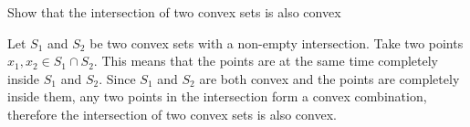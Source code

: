 \begin{problem}
Show that the intersection of two convex sets is also convex
\end{problem}

\begin{solution}
Let $S_1$ and $S_2$ be two convex sets with a non-empty intersection. Take two points $x_1, x_2 \in S_1\cap S_2$. This means that the points are at the same time completely inside $S_1$ and $S_2$. Since $S_1$ and $S_2$ are both convex and the points are completely inside them, any two points in the intersection form a convex combination, therefore the intersection of two convex sets is also convex.
\end{solution}

 	

